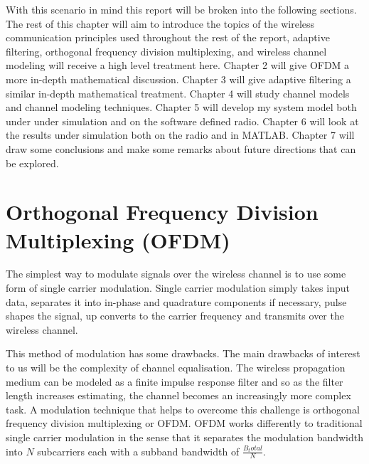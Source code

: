 With this scenario in mind this report will be broken %
into the following sections. The rest of this chapter %
will aim to introduce the topics of the wireless %
communication principles used throughout the rest %
of the report, adaptive filtering, orthogonal %
frequency division multiplexing, and wireless %
channel modeling will receive a high level treatment %
here. Chapter 2 will give OFDM a more in-depth %
mathematical discussion. %
Chapter 3 will give adaptive filtering a similar %
in-depth mathematical treatment. Chapter 4 will study %
channel models and channel modeling techniques. %
Chapter 5 will develop my system model both under %
under simulation and on the software defined radio. %
Chapter 6 will look at the results under simulation %
both on the radio and in MATLAB. Chapter 7 will draw %
some conclusions and make some remarks about future %
directions that can be explored.

\section{Orthogonal Frequency Division Multiplexing %
(OFDM)}

The simplest way to modulate signals over the wireless %
channel is to use some form of single carrier modulation. %
Single carrier modulation simply takes input data, separates %
it into in-phase and quadrature components if necessary, pulse %
shapes the signal, up converts to the carrier frequency and %
transmits over the wireless channel.

This method of modulation has some drawbacks. %
The main drawbacks of interest to us will be the complexity of %
channel equalisation. The wireless propagation medium can be %
modeled as a finite impulse response filter %
and so as the filter length increases estimating, %
the channel becomes an increasingly more complex task. %
A modulation technique that helps to overcome this challenge %
is orthogonal frequency division multiplexing or OFDM. %
OFDM works differently to traditional single carrier %
modulation in the sense that it separates the modulation %
bandwidth into $N$ subcarriers each with a subband bandwidth of %
$\frac{B_total}{N}$.


